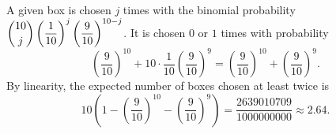 A given box is chosen $j$ times with the binomial probability $\dbinom{10}{j}\left(\dfrac{1}{10}\right)^j\left(\dfrac{9}{10}\right)^{10-j}$. It is chosen $0$ or $1$ times with probability
\[\left(\dfrac{9}{10}\right)^{10}+10\cdot\dfrac{1}{10}\left(\dfrac{9}{10}\right)^9=\left(\dfrac{9}{10}\right)^{10}+\left(\dfrac{9}{10}\right)^9.\]
By linearity, the expected number of boxes chosen at least twice is
\[10\left(1-\left(\dfrac{9}{10}\right)^{10}-\left(\dfrac{9}{10}\right)^{9}\right)=\boxed{\dfrac{2639010709}{1000000000}}\approx2.64.\]
